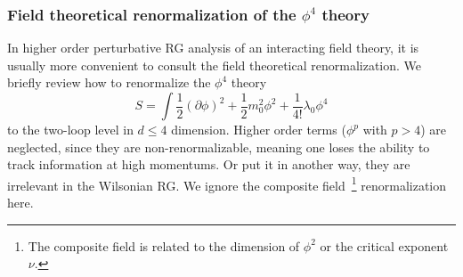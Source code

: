 \documentclass[submission, PhysLectNotes]{SciPost}
\begin{document}
\subsubsection*{Field theoretical renormalization of the $\phi^4$ theory}
In higher order perturbative RG analysis of an interacting field theory, it is usually more convenient to consult the field theoretical renormalization. We briefly review how to renormalize the $\phi^4$ theory
\begin{equation}
	S = \int \frac{1}{2}\left(\partial \phi\right)^2 + \frac{1}{2}m_0^2\phi^2 + \frac{1}{4!}\lambda_0 \phi^4
\end{equation}
to the two-loop level in $d\leq4$ dimension. Higher order terms ($\phi^p$ with $p>4$) are neglected, since they are non-renormalizable, meaning one loses the ability to track information at high momentums. Or put it in another way, they are irrelevant in the Wilsonian RG. We ignore the composite field~\footnote{The composite field is related to the dimension of $\phi^2$ or the critical exponent $\nu$.} renormalization here.
\end{document}
